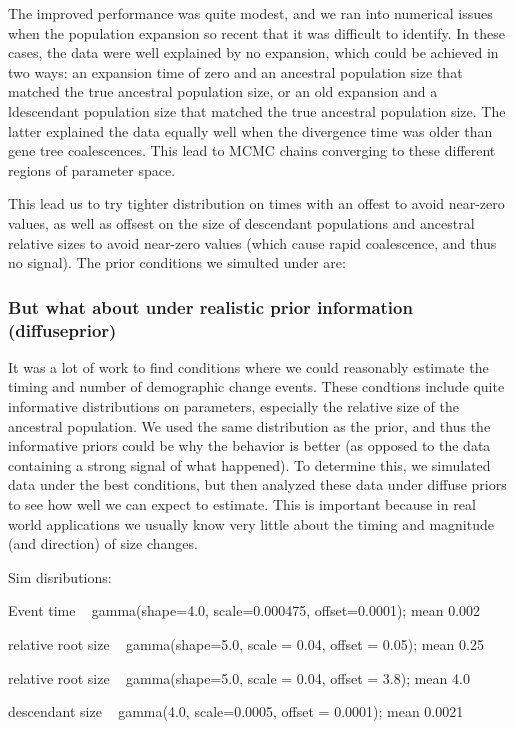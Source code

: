 \begin{linenomath}
The improved performance was quite modest, and we ran into numerical issues when the
population expansion so recent that it was difficult to identify.
In these cases, the data were well explained by no expansion, which could be achieved in two ways: an expansion time of zero and an ancestral population size that matched the true ancestral population size, or an old expansion and a ldescendant population size that matched the true ancestral population size. The latter explained the data equally well when the divergence time was older than gene tree coalescences. This lead to MCMC chains converging to these different regions of parameter space.

This lead us to try tighter distribution on times with an offest to avoid
near-zero values, as well as offsest on the size of descendant populations and
ancestral relative sizes to avoid near-zero values (which cause rapid
coalescence, and thus no signal). The prior conditions we simulted under are:


\subsubsection{But what about under realistic prior information (diffuseprior)}

It was a lot of work to find conditions where we could reasonably estimate
the timing and number of demographic change events.
These condtions include quite informative distributions on parameters,
especially the relative size of the ancestral population.
We used the same distribution as the prior, and thus the informative priors
could be why the behavior is better (as opposed to the data containing a strong
signal of what happened).
To determine this, we simulated data under the best conditions,
but then analyzed these data under diffuse priors to see how
well we can expect to estimate.
This is important because in real world applications we usually know very
little about the timing and magnitude (and direction) of size changes.

Sim disributions:

Event time ~ gamma(shape=4.0, scale=0.000475, offset=0.0001); mean 0.002

relative root size ~ gamma(shape=5.0, scale = 0.04, offset = 0.05); mean 0.25

relative root size ~ gamma(shape=5.0, scale = 0.04, offset = 3.8); mean 4.0

descendant size ~ gamma(4.0, scale=0.0005, offset = 0.0001); mean 0.0021


\end{linenomath}
